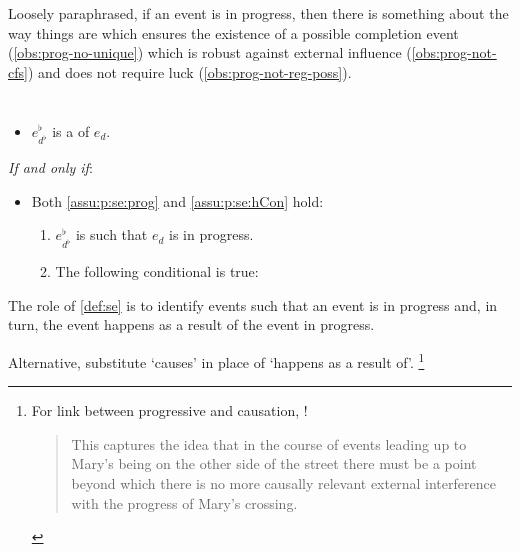 \begin{note}
  \noindent%
  Loosely paraphrased, if an event is in progress, then there is something about the way things are which ensures the existence of a possible completion event (\autoref{obs:prog-no-unique}) which is robust against external influence (\autoref{obs:prog-not-cfs}) and does not require luck (\autoref{obs:prog-not-reg-poss}).
\end{note}


\section{}

\begin{note}
  \begin{definition}[\se{3}]
    \label{def:se}
    \vspace{-\baselineskip}
    \begin{itemize}
    \item
      \(e^{\flat}_{d^{\flat}}\) is a \emph{} of \(e_{d}\).
    \end{itemize}
    \emph{If and only if}:
    \begin{itemize}
    \item
      Both \ref{assu:p:se:prog} and \ref{assu:p:se:hCon} hold:
    \begin{enumerate}[label=\arabic*., ref=(\arabic*)]
    \item
      \label{assu:p:se:prog}
      \(e^{\flat}_{d^{\flat}}\) is such that \(e_{d}\) is in progress.
    \item
      \label{assu:p:se:hCon}
      The following conditional is true:
    \end{enumerate}
  \end{itemize}
  \vspace{-\baselineskip}
  \end{definition}

  \noindent%
  The role of \autoref{def:se} is to identify events such that an event is in progress and, in turn, the event happens as a result of the event in progress.

  Alternative, substitute `causes' in place of `happens as a result of'.%
  \footnote{
    For link between progressive and causation, \textcite{Szabo:2004ul}!

    \begin{quote}
      This captures the idea that in the course of events leading up to Mary’s being on the other side of the street there must be a point beyond which there is no more causally relevant external interference with the progress of Mary’s crossing.
    \end{quote}
  }
\end{note}


